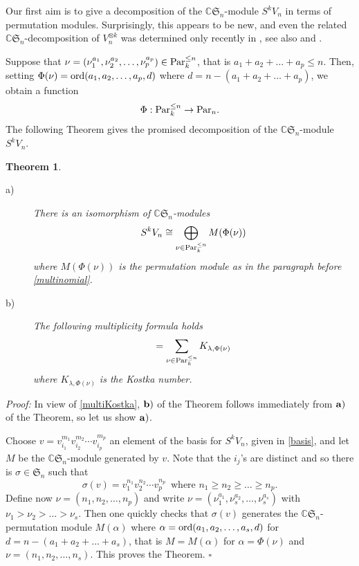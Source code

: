 \documentclass[10pt,hidelinks]{article}
\newcommand{\ord}{{\rm{ord}}}
\newcommand{\Par}{{\rm Par}   }
\newcommand{\CC}{ \mathbb C }
\newcommand{\Si}{\mathfrak{S}}
\newtheorem{theorem}{Theorem}
\newenvironment{dem}{\noindent \textit{Proof:} }{\quad \hfill $\square$}
\numberwithin{equation}{section}
\begin{document}
\medskip
Our first aim is to give a decomposition of the $ \CC \Si_n$-module $ S^k V_n $ in terms of
permutation modules. 
Surprisingly, this appears to be new, and even the related $ \CC \Si_n$-decomposition 
of $ V_n^{\otimes k } $ was determined only recently in \cite{BHH}, see also 
\cite{BDM} and \cite{PMartin2}. 

\medskip
Suppose that $ \nu= (\nu_1^{a_1}, \nu_2^{a_2}, \ldots, \nu_p^{a_p} ) \in \Par_k^{\le n} $,
that is $ a_1 + a_2 + \ldots + a_p \le n $. Then, setting
$ \Phi(\nu) = \ord(a_1, a_2, \ldots, a_p, d )$ where $ d= n -( a_1 + a_2 + \ldots + a_p) $, 
we obtain a function
\begin{equation}\label{weobtainafunction}
\Phi: \Par_k^{\le n} \rightarrow \Par_n. 
\end{equation}
The following Theorem gives the promised decomposition of the $ \CC \Si_n$-module $ S^k V_n $.
\begin{theorem}\label{firstthm}
  \begin{description}
  \item[a)] There is an isomorphism of $ \CC \Si_n$-modules
  \begin{equation}
 S^k V_n \cong \bigoplus_{ \nu \in \Par_k^{\le n} } M( \Phi( \nu) )
  \end{equation}
where $ M( \Phi( \nu) ) $ is the permutation module as in the paragraph before \eqref{multinomial}.
\item[b)] The following multiplicity formula holds
\begin{equation}
[ S^k V_n: S(\lambda)]  = \sum_{ \nu \in \Par_k^{\le n} } {  K_{\lambda,  \Phi(\nu)} }
\end{equation}
where $ K_{\lambda,  \Phi(\nu)} $ is the Kostka number. 
  \end{description}
\end{theorem}  
\begin{dem}
In view of \eqref{multiKostka}, ${\bf b)} $ of the Theorem follows immediately from ${\bf a)} $
of the Theorem, so let us show ${\bf a)} $.

\medskip
Choose $ v=  v_{i_1}^{m_1} v_{i_2}^{m_2} \cdots v_{i_p}^{m_p} $ an element of the basis 
for $  S^k V_n$, given in \eqref{basis}, and let $ M $ be the $\CC \Si_n $-module generated by
$ v $. Note that the $i_j $'s are distinct and so there is $ \sigma \in \Si_n $ such that
\begin{equation}
\sigma(v) = v_1^{n_1} v_2^{n_2} \cdots v_p^{n_p} \, \mbox{ where } n_1  \ge n_2 \ge \ldots \ge n_p.
\end{equation}
Define now $ \nu =  (n_1, n_2, \ldots, n_p) $
and write $ \nu = (\nu_1^{a_1},  \nu_s^{a_2},  \ldots, \nu_s^{a_s} )  $
with $ \nu_1 > \nu_2 > \ldots > \nu_s $. Then one quickly checks that 
$ \sigma(v) $ generates the $\CC \Si_n $-permutation module $ M(\alpha) $
where $ \alpha= \ord(a_1, a_2, \ldots, a_s, d ) $ for $ d= n - (a_1 +a_2 + \ldots + a_s ) $,
that is $ M =  M(\alpha) $ for 
$ \alpha = \Phi(\nu) $ and $ \nu = (n_1, n_2, \ldots, n_s) $. This proves the Theorem. 
\end{dem}
\end{document}
